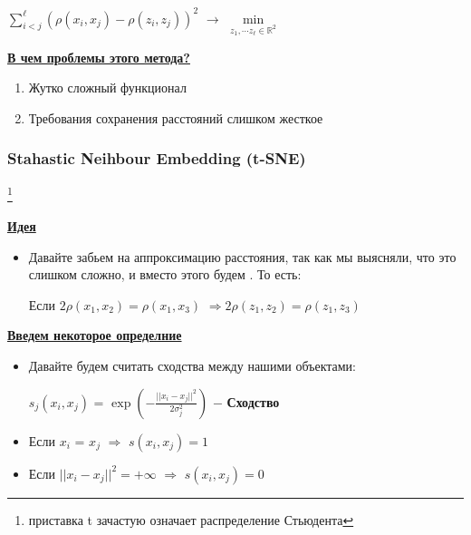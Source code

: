             \begin{center}
            \large
                $\sum\limits_{i < j}^\ell (\rho(x_i, x_j) - \rho(z_i, z_j))^2$ $\longrightarrow$ $\min\limits_{z_1, \cdots z_\ell \in \mathbb{R}^2}$
            \end{center}

            \underline{\textbf{В чем проблемы этого метода?}}
            \begin{enumerate}
                \item Жутко сложный функционал
                \item Требования сохранения расстояний слишком жесткое
            \end{enumerate}

        \subsubsection{Stahastic Neihbour Embedding (t-SNE)}\footnote{приставка t зачастую означает распределение Стьюдента}

            \underline{\textbf{Идея}}
            \begin{itemize}
                \item Давайте забьем на аппроксимацию расстояния, так как мы выясняли, что это слишком сложно, и вместо этого будем . То есть:
                \begin{center}
                \large
                    Если $2\rho(x_1, x_2) = \rho(x_1, x_3)$ $\Longrightarrow 2\rho(z_1, z_2) = \rho(z_1, z_3)$
                \end{center}
            \end{itemize}

            \underline{\textbf{Введем некоторое определние}}
            \begin{itemize}
                \item Давайте будем считать сходства между нашими объектами:
                \begin{center}
                    \large
                    $s_j(x_i, x_j)$ = $\exp(- \frac{ ||x_i - x_j||^2}{2 \sigma_j^2})$ $-$ \textbf{Сходство}
                \end{center}
                \item Если $x_i$ = $x_j$ $\Longrightarrow$ $s(x_i, x_j) = 1$
                \item Если $||x_i - x_j||^2 = + \infty$ $\Longrightarrow$ $s(x_i, x_j) = 0$
            \end{itemize}

